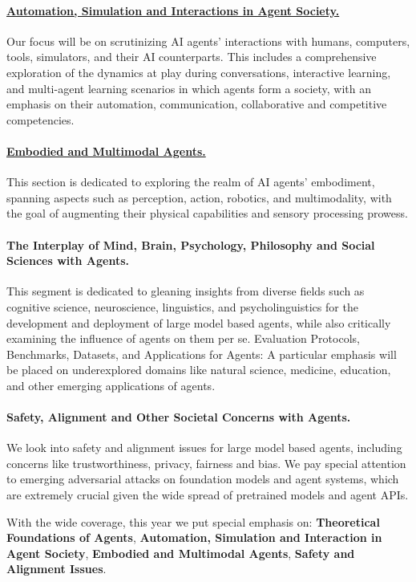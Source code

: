 \documentclass[10pt]{article} %
\newcounter{exa}
\begin{document}
\paragraph{\underline{Automation, Simulation and Interactions in Agent Society.}} Our focus will be on scrutinizing AI agents' interactions with humans, computers, tools, simulators, and their AI counterparts. This includes a comprehensive exploration of the dynamics at play during conversations, interactive learning, and multi-agent learning scenarios in which agents form a society, with an emphasis on their automation, communication, collaborative and competitive competencies.

\paragraph{\underline{Embodied and Multimodal Agents.}} This section is dedicated to exploring the realm of AI agents' embodiment, spanning aspects such as perception, action, robotics, and multimodality, with the goal of augmenting their physical capabilities and sensory processing prowess. 

\paragraph{The Interplay of Mind, Brain, Psychology, Philosophy and Social Sciences with Agents.} This segment is dedicated to gleaning insights from diverse fields such as cognitive science, neuroscience, linguistics, and psycholinguistics for the development and deployment of large model based agents, while also critically examining the influence of agents on them per se.
Evaluation Protocols, Benchmarks, Datasets, and Applications for Agents: A particular emphasis will be placed on underexplored domains like natural science, medicine, education, and other emerging applications of agents.

\paragraph{Safety, Alignment and Other Societal Concerns with Agents.} We look into safety and alignment issues for large model based agents, including concerns like trustworthiness, privacy, fairness and bias. We pay special attention to emerging adversarial attacks on foundation models and agent systems, which are extremely crucial given the wide spread of pretrained models and agent APIs. 


With the wide coverage, this year we put special emphasis on: {\bf Theoretical Foundations of Agents}, {\bf Automation, Simulation and Interaction in Agent Society}, {\bf Embodied and Multimodal Agents}, {\bf Safety and Alignment Issues}. 
\end{document}
